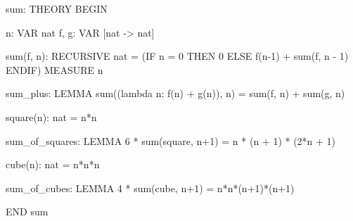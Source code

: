 sum: THEORY
  BEGIN

   n: VAR nat
   f, g: VAR [nat -> nat]

   sum(f, n): RECURSIVE nat =
  (IF n = 0
      THEN 0
      ELSE f(n-1) + sum(f, n - 1)
   ENDIF)
  MEASURE n

 sum_plus: LEMMA
    sum((lambda n: f(n) + g(n)), n)
   = sum(f, n) + sum(g, n)

  square(n): nat = n*n

  sum_of_squares: LEMMA
    6 * sum(square, n+1) = n * (n + 1) * (2*n + 1)

  cube(n): nat = n*n*n 

  sum_of_cubes: LEMMA
    4 * sum(cube, n+1) = n*n*(n+1)*(n+1)

 END sum
